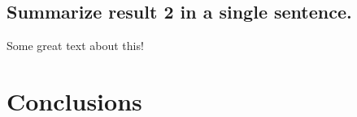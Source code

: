 \documentclass[11pt,]{article}
\begin{document}
\subsection{Summarize result 2 in a single
sentence.}\label{summarize-result-2-in-a-single-sentence.}

Some great text about this!

\section{Conclusions}\label{conclusions}
\newpage
\singlespacing 
\renewcommand\refname{References}

\end{document}
